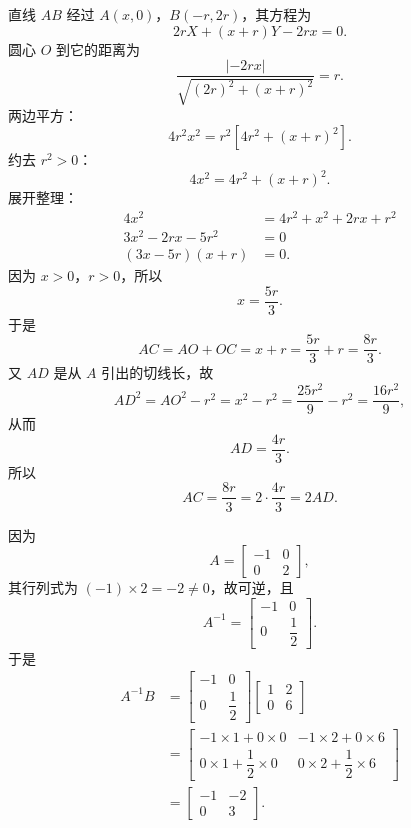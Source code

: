 \begin{answer}
直线 $AB$ 经过 $A(x,0)$，$B(-r,2r)$，其方程为
\nopagebreak[4]
\[2rX+(x+r)Y-2rx=0.\]
圆心 $O$ 到它的距离为
\nopagebreak[4]
\[\frac{|-2rx|}{\sqrt{(2r)^2+(x+r)^2}}=r.\]
两边平方：
\nopagebreak[4]
\[4r^2x^2=r^2\left[4r^2+(x+r)^2\right].\]
约去 $r^2>0$：
\nopagebreak[4]
\[4x^2=4r^2+(x+r)^2.\]
展开整理：
\nopagebreak[4]
\[\begin{aligned}
4x^2&=4r^2+x^2+2rx+r^2\\
3x^2-2rx-5r^2&=0\\
(3x-5r)(x+r)&=0.
\end{aligned}\]
因为 $x>0$，$r>0$，所以
\nopagebreak[4]
\[x=\frac{5r}{3}.\]
于是
\nopagebreak[4]
\[AC=AO+OC=x+r=\frac{5r}{3}+r=\frac{8r}{3}.\]
又 $AD$ 是从 $A$ 引出的切线长，故
\nopagebreak[4]
\[AD^2=AO^2-r^2=x^2-r^2
=\frac{25r^2}{9}-r^2=\frac{16r^2}{9},\]
从而
\nopagebreak[4]
\[AD=\frac{4r}{3}.\]
所以
\nopagebreak[4]
\[AC=\frac{8r}{3}=2\cdot\frac{4r}{3}=2AD.\]


因为
\nopagebreak[4]
\[A=\begin{bmatrix}-1&0\\0&2\end{bmatrix},\]
其行列式为 $(-1)\times2=-2\neq0$，故可逆，且
\nopagebreak[4]
\[A^{-1}=\begin{bmatrix}-1&0\\0&\dfrac12\end{bmatrix}.\]
于是
\nopagebreak[4]
\[\begin{aligned}
A^{-1}B
&=\begin{bmatrix}-1&0\\0&\dfrac12\end{bmatrix}
\begin{bmatrix}1&2\\0&6\end{bmatrix}\\
&=\begin{bmatrix}
-1\times1+0\times0 & -1\times2+0\times6\\
0\times1+\dfrac12\times0 & 0\times2+\dfrac12\times6
\end{bmatrix}\\
&=\begin{bmatrix}-1&-2\\0&3\end{bmatrix}.
\end{aligned}\]


\end{answer}
